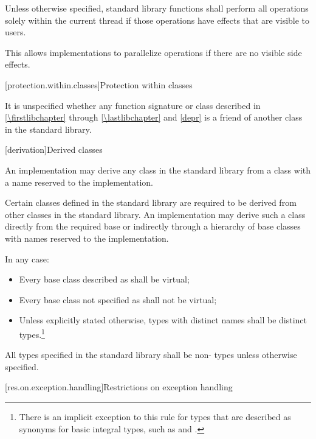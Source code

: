 \pnum
Unless otherwise specified, \Cpp{} standard library functions shall perform all operations
solely within the current thread if those operations have effects that are
visible to users.

\pnum
\begin{note}
This allows implementations to parallelize operations if there are no visible
%
side effects.
\end{note}

[protection.within.classes]{Protection within classes}

\pnum
{}%
It is unspecified whether any function signature or class described in
\ref{\firstlibchapter} through \ref{\lastlibchapter} and \ref{depr} is a
friend of another class in the \Cpp{} standard library.

[derivation]{Derived classes}

\pnum
{}%
%
An implementation may derive any class in the \Cpp{} standard library from a class with a
name reserved to the implementation.

\pnum
Certain classes defined in the \Cpp{} standard library are required to be derived from
other classes
in the \Cpp{} standard library.
%
An implementation may derive such a class directly from the required base or indirectly
through a hierarchy of base classes with names reserved to the implementation.

\pnum
In any case:
\begin{itemize}
\item
Every base class described as
shall be virtual;
%
\item
Every base class not specified as
 shall not be virtual;
\item
Unless explicitly stated otherwise, types with distinct names shall be distinct
types.\footnote{There is an implicit exception to this rule for types that are
described as synonyms for basic integral types, such as
 and
.}
\end{itemize}

\pnum
All types specified in the \Cpp{} standard library shall be non- types
unless otherwise specified.

[res.on.exception.handling]{Restrictions on exception handling}%
%

